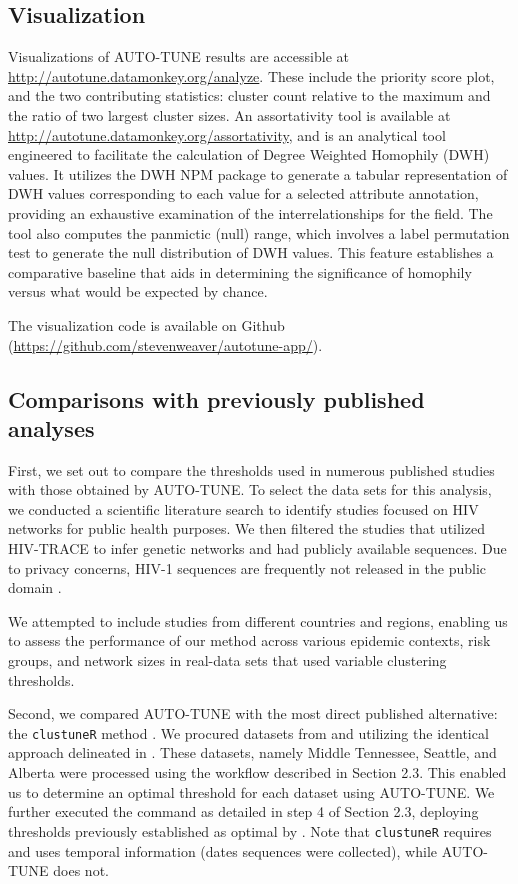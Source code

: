 \documentclass[utf8]{FrontiersinHarvard} %
\begin{document}
\subsection{Visualization}

Visualizations of AUTO-TUNE results are accessible at
\url{http://autotune.datamonkey.org/analyze}. These include the priority score
plot, and the two contributing statistics: cluster count relative to the
maximum and the ratio of two largest cluster sizes. \label{fig:webapp} An
assortativity tool is available at
\url{http://autotune.datamonkey.org/assortativity}, and is an analytical tool
engineered to facilitate the calculation of Degree Weighted Homophily (DWH)
values. It utilizes the DWH NPM package to generate a tabular representation of
DWH values corresponding to each value for a selected attribute annotation,
providing an exhaustive examination of the interrelationships for the field.
The tool also computes the panmictic (null) range, which involves a label
permutation test to generate the null distribution of DWH values. This feature
establishes a comparative baseline that aids in determining the significance of
homophily versus what would be expected by chance.

The visualization code is available on Github
(\url{https://github.com/stevenweaver/autotune-app/}).

\subsection{Comparisons with previously published analyses}

First, we set out to compare the thresholds used in numerous published studies
with those obtained by AUTO-TUNE. To select the data sets for this analysis, we
conducted a scientific literature search to identify studies focused on HIV
networks for public health purposes. We then filtered the studies that utilized
HIV-TRACE to infer genetic networks and had publicly available sequences. Due
to privacy concerns, HIV-1 sequences are frequently not released in the public
domain \cite{Inzaule:2023aa}.

We attempted to include studies from different countries and regions, enabling
us to assess the performance of our method across various epidemic contexts,
risk groups, and network sizes in real-data sets that used variable clustering
thresholds.

Second, we compared AUTO-TUNE with the most direct published alternative: the
	{\tt clustuneR} method \citep{chato_public_2020}. We procured datasets from
\citep{wolf_short_2017} and \citep{vrancken_multi-faceted_2017} utilizing the
identical approach delineated in \cite{chato_public_2020}. These datasets,
namely Middle Tennessee, Seattle, and Alberta were processed using the workflow
described in Section 2.3. This enabled us to determine an optimal threshold for
each dataset using AUTO-TUNE. We further executed the command as detailed in
step 4 of Section 2.3, deploying thresholds previously established as optimal
by \citep{chato_public_2020}. Note that {\tt clustuneR} requires and uses
temporal information (dates sequences were collected), while AUTO-TUNE does
not.
\end{document}
